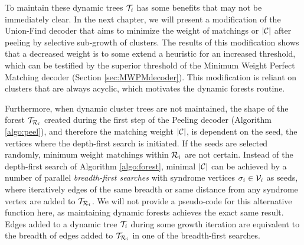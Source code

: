 To maintain these dynamic trees $\mathcal{T}_i$ has some benefits that may not be immediately clear. In the next chapter, we will present a modification of the Union-Find decoder that aims to minimize the weight of matchings or $|\mathcal{C}|$ after peeling by selective sub-growth of clusters. The results of this modification shows that a decreased weight is to some extend a heuristic for an increased threshold, which can be testified by the superior threshold of the Minimum Weight Perfect Matching decoder (Section \ref{sec:MWPMdecoder}). This modification is reliant on clusters that are always acyclic, which motivates the dynamic forests routine. 

Furthermore, when dynamic cluster trees are not maintained, the shape of the forest $\mathcal{T}_{\mathcal{R}_i}$ created during the first step of the Peeling decoder (Algorithm \ref{algo:peel}), and therefore the matching weight $|\mathcal{C}|$, is dependent on the seed, the vertices where the depth-first search is initiated. If the seeds are selected randomly, minimum weight matchings within $\mathcal{R}_i$ are not certain. Instead of the depth-first search of Algorithm \ref{algo:forest}, minimal $|\mathcal{C}|$ can be achieved by a number of parallel \emph{breadth-first searches} with syndrome vertices $\sigma_i \in \mathcal{V}_i$ as seeds, where iteratively edges of the same breadth or same distance from any syndrome vertex are added to $\mathcal{T}_{\mathcal{R}_i}$. We will not provide a pseudo-code for this alternative  function here, as maintaining dynamic forests achieves the exact same result. Edges added to a dynamic tree $\mathcal{T}_i$ during some growth iteration are equivalent to the breadth of edges added to $\mathcal{T}_{\mathcal{R}_i}$ in one of the breadth-first searches. 

